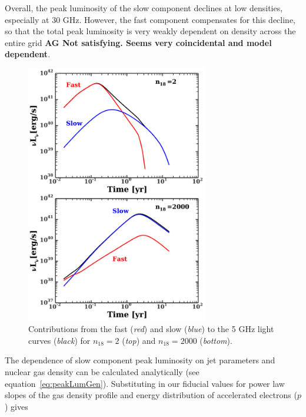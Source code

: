 \documentclass[usenatbib,fleqn]{mnras}
\begin{document}
Overall, the peak luminosity of the slow component declines at low
densities, especially at 30 GHz. However, the fast component
compensates for this decline, so that the total peak luminosity is
very weakly dependent on density across the entire grid {\bf AG Not
  satisfying. Seems very coincidental and model dependent}. 

\begin{figure}
\includegraphics[width=8cm]{components.pdf}
\caption{\label{fig:components} Contributions from the fast
  (\textit{red}) and slow (\textit{blue}) to the 5 GHz light curves
  (\textit{black}) for $n_{18}=2$ (\textit{top}) and $n_{18}=2000$
  (\textit{bottom}).}
\end{figure}


The dependence of slow component peak luminosity on jet parameters and
nuclear gas density can be calculated analytically (see
equation~\ref{eq:peakLumGen}). Substituting in our fiducial values for
power law slopes of the gas density profile and energy distribution of
accelerated electrons ($p$) gives
\end{document}
